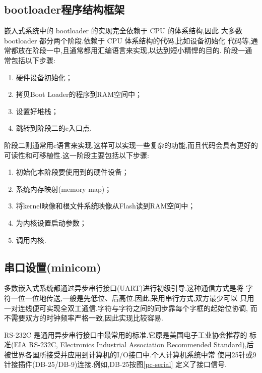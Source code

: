 \subsection{bootloader程序结构框架}
	嵌入式系统中的 bootloader 的实现完全依赖于 CPU 的体系结构,因此
大多数 bootloader 都分两个阶段.依赖于 CPU 体系结构的代码,比如设备初始化
代码等,通常都放在阶段一中,且通常都用汇编语言来实现,以达到短小精悍的目的.
阶段一通常包括以下步骤:
\begin{enumerate}\itemsep=-5pt
  \item 硬件设备初始化；
  \item 拷贝Boot Loader的程序到RAM空间中；
  \item 设置好堆栈；
  \item 跳转到阶段二的c入口点.
\end{enumerate}

	阶段二则通常用c语言来实现,这样可以实现一些复杂的功能,而且代码会具有更好的可读性和可移植性.这一阶段主要包括以下步骤:
\begin{enumerate}\itemsep=-3pt
  \item 初始化本阶段要使用到的硬件设备；
  \item 系统内存映射(memory map)；
  \item 将kernel映像和根文件系统映像从Flash读到RAM空间中； 
  \item 为内核设置启动参数；
  \item 调用内核.
\end{enumerate}

\subsection{串口设置(minicom)}
    多数嵌入式系统都通过异步串行接口(UART)进行初级引导.这种通信方式是将
字符一位一位地传送,一般是先低位、后高位.因此,采用串行方式,双方最少可以
只用一对连线便可实现全双工通信.字符与字符之间的同步靠每个字框的起始位协调,
而不需要双方的时钟频率严格一致,因此实现比较容易.

    RS-232C 是通用异步串行接口中最常用的标准.它原是美国电子工业协会推荐的
标准(EIA RS-232C, Electronics Industrial Association Recommended
Standard),后被世界各国所接受并应用到计算机的I/O接口中.个人计算机系统中常
使用25针或9针接插件(DB-25/DB-9)连接.例如,DB-25按图\ref{pc-serial}
定义了接口信号.

